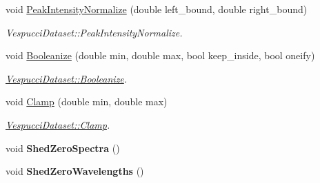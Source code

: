 \begin{DoxyCompactItemize}
\item 
void \hyperlink{class_vespucci_dataset_a358b924b2ec9277e054fb52462ff5f61}{Peak\+Intensity\+Normalize} (double left\+\_\+bound, double right\+\_\+bound)
\begin{DoxyCompactList}\small\item\em Vespucci\+Dataset\+::\+Peak\+Intensity\+Normalize. \end{DoxyCompactList}\item 
void \hyperlink{class_vespucci_dataset_a21f1635124ce556cd1578ffc1178ceef}{Booleanize} (double min, double max, bool keep\+\_\+inside, bool oneify)
\begin{DoxyCompactList}\small\item\em \hyperlink{class_vespucci_dataset_a21f1635124ce556cd1578ffc1178ceef}{Vespucci\+Dataset\+::\+Booleanize}. \end{DoxyCompactList}\item 
void \hyperlink{class_vespucci_dataset_a4b280cfa6a8a99df7594aab5ebb3e0b0}{Clamp} (double min, double max)
\begin{DoxyCompactList}\small\item\em \hyperlink{class_vespucci_dataset_a4b280cfa6a8a99df7594aab5ebb3e0b0}{Vespucci\+Dataset\+::\+Clamp}. \end{DoxyCompactList}\item 
void {\bfseries Shed\+Zero\+Spectra} ()\hypertarget{class_vespucci_dataset_a63d5387d76c9a345811b795b846e9699}{}\label{class_vespucci_dataset_a63d5387d76c9a345811b795b846e9699}

\item 
void {\bfseries Shed\+Zero\+Wavelengths} ()\hypertarget{class_vespucci_dataset_a77e67b083a776d38b189a1663c67efc9}{}\label{class_vespucci_dataset_a77e67b083a776d38b189a1663c67efc9}


\end{DoxyCompactItemize}
